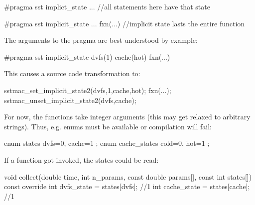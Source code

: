\begin{CppCode}
#pragma sst implict_state ...
{
 //all statements here have that state
}

#pragma sst implicit_state ...
fxn(...) //implicit state lasts the entire function
\end{CppCode}

The arguments to the pragma are best understood by example:

\begin{CppCode}
#pragma sst implicit_state dvfs(1) cache(hot)
fxn(...)
\end{CppCode}
This causes a source code transformation to:

\begin{CppCode}
sstmac_set_implicit_state2(dvfs,1,cache,hot);
fxn(...);
sstmac_unset_implicit_state2(dvfs,cache);
\end{CppCode}
For now, the functions take integer arguments (this may get relaxed to arbitrary strings).
Thus, e.g. enums must be available or compilation will fail:

\begin{CppCode}
enum states {
 dvfs=0,
 cache=1
};
enum cache_states {
 cold=0,
 hot=1
};
\end{CppCode}

If a  function got invoked, the states could be read:

\begin{CppCode}
void collect(double time, int n_params, const double params[], 
			const int states[]) const override {
  int dvfs_state = states[dvfs];  //1
  int cache_state = states[cache]; //1
}
\end{CppCode}
